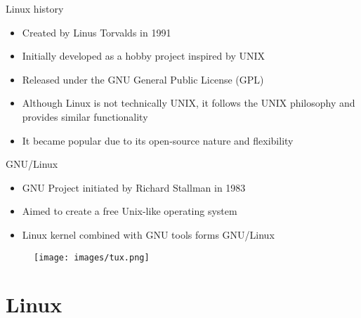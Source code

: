 \documentclass{beamer}
\begin{document}
\begin{frame}{Linux history}
  \begin{itemize}
    \item Created by Linus Torvalds in 1991
    \item Initially developed as a hobby project inspired by UNIX
    \item Released under the GNU General Public License (GPL)
    \item Although Linux is not technically UNIX, it follows the UNIX philosophy and provides similar functionality
    \item It became popular due to its open-source nature and flexibility
  \end{itemize}
\end{frame}

\begin{frame}{GNU/Linux}
  \begin{minipage}[t]{0.6\textwidth}
    \begin{itemize}
      \item GNU Project initiated by Richard Stallman in 1983
      \item Aimed to create a free Unix-like operating system
      \item Linux kernel combined with GNU tools forms GNU/Linux
    \end{itemize}
  \end{minipage}
  \hfill
  \begin{minipage}[t]{0.35\textwidth}
    \begin{figure}[h]
      \texttt{[image: images/tux.png]}
    \end{figure}
  \end{minipage}
\end{frame}

\section{Linux}
\end{document}
